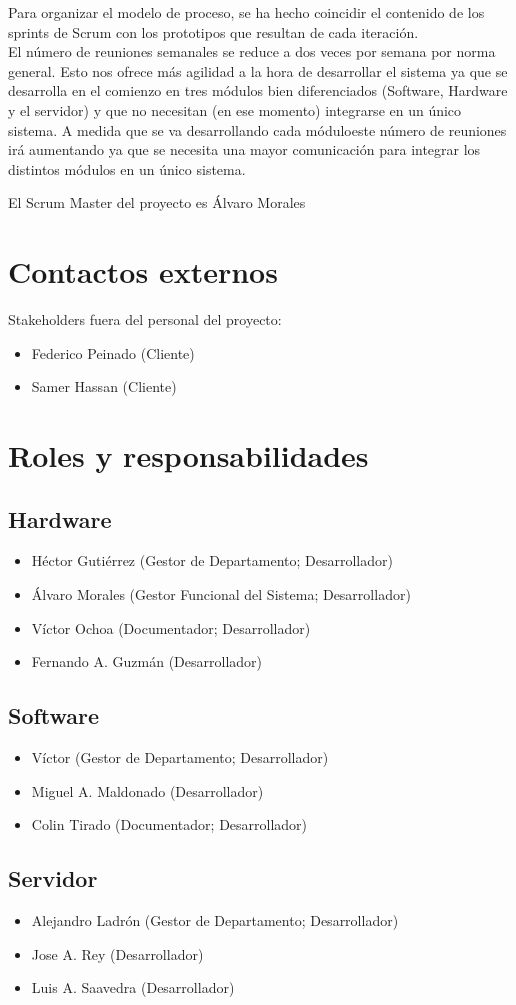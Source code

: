 Para organizar el modelo de proceso, se ha hecho coincidir el contenido de los sprints de Scrum con los prototipos que resultan de cada iteración. \\

El número de reuniones semanales se reduce a dos veces por semana por norma general. Esto nos ofrece más agilidad a la hora de desarrollar el sistema ya que se desarrolla en el comienzo en tres módulos bien diferenciados (Software, Hardware y el servidor) y que no necesitan (en ese momento) integrarse en un único sistema. A medida que se va desarrollando cada móduloeste número de reuniones irá aumentando ya que se necesita una mayor comunicación para integrar los distintos módulos en un único sistema.

El Scrum Master del proyecto es Álvaro Morales
\section{Contactos externos}
Stakeholders fuera del personal del proyecto:
\begin{itemize}
\item Federico Peinado (Cliente)
\item Samer Hassan (Cliente)
\end{itemize}

\section{Roles y responsabilidades}
\subsection{Hardware}
\begin{itemize}
\item Héctor Gutiérrez (Gestor de Departamento; Desarrollador)
\item Álvaro Morales (Gestor Funcional del Sistema; Desarrollador)
\item Víctor Ochoa  (Documentador; Desarrollador)
\item Fernando A. Guzmán  (Desarrollador)
\end{itemize}


\subsection{Software}
\begin{itemize}
\item Víctor (Gestor de Departamento; Desarrollador)
\item Miguel A. Maldonado (Desarrollador)
\item Colin Tirado (Documentador; Desarrollador)
\end{itemize}

\subsection{Servidor}
\begin{itemize}
\item Alejandro Ladrón (Gestor de Departamento; Desarrollador)
\item Jose A. Rey (Desarrollador)
\item Luis A. Saavedra (Desarrollador)
\end{itemize}